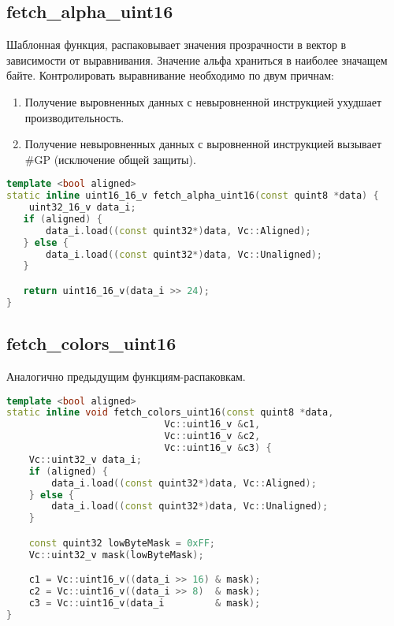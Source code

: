 \subsection{fetch\_alpha\_uint16}
Шаблонная функция, распаковывает значения прозрачности в вектор в зависимости от выравнивания. Значение альфа храниться в наиболее значащем байте. Контролировать выравнивание необходимо по двум причнам:
\begin{enumerate}
\item Получение выровненных данных с невыровненной инструкцией ухудшает производительность.  
\item Получение невыровненных данных с выровненной инструкцией вызывает \#GP (исключение общей защиты).
\end{enumerate}
\begin{lstlisting}[language=c++]
template <bool aligned>
static inline uint16_16_v fetch_alpha_uint16(const quint8 *data) {
    uint32_16_v data_i;
   if (aligned) {
       data_i.load((const quint32*)data, Vc::Aligned);
   } else {
       data_i.load((const quint32*)data, Vc::Unaligned);
   }

   return uint16_16_v(data_i >> 24);
}
\end{lstlisting}

\subsection{fetch\_colors\_uint16}
Аналогично предыдущим функциям-распаковкам.
\begin{lstlisting}[language=c++]
template <bool aligned>
static inline void fetch_colors_uint16(const quint8 *data,
                            Vc::uint16_v &c1,
                            Vc::uint16_v &c2,
                            Vc::uint16_v &c3) {
    Vc::uint32_v data_i;
    if (aligned) {
        data_i.load((const quint32*)data, Vc::Aligned);
    } else {
        data_i.load((const quint32*)data, Vc::Unaligned);
    }

    const quint32 lowByteMask = 0xFF;
    Vc::uint32_v mask(lowByteMask);

    c1 = Vc::uint16_v((data_i >> 16) & mask);
    c2 = Vc::uint16_v((data_i >> 8)  & mask);
    c3 = Vc::uint16_v(data_i         & mask);
}
\end{lstlisting}

